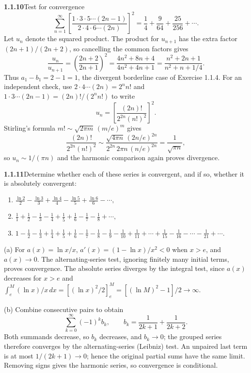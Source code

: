 \par\bigskip
\noindent\textbf{1.1.10}\quad Test for convergence
\[
\sum_{n=1}^{\infty}\left[\frac{1\cdot3\cdot5\cdots(2n-1)}{2\cdot4\cdot6\cdots(2n)}\right]^{2}
=\frac{1}{4}+\frac{9}{64}+\frac{25}{256}+\cdots.
\]
\solution
Let $u_n$ denote the squared product. The product for $u_{n+1}$ has the
extra factor $(2n+1)/(2n+2)$, so cancelling the common factors gives
\[
 \frac{u_n}{u_{n+1}}=\left(\frac{2n+2}{2n+1}\right)^2
 =\frac{4n^2+8n+4}{4n^2+4n+1}
 =\frac{n^2+2n+1}{n^2+n+1/4}.
\]
Thus $a_1-b_1=2-1=1$, the divergent borderline case of Exercise 1.1.4.
For an independent check, use $2\cdot4\cdots(2n)=2^nn!$ and
$1\cdot3\cdots(2n-1)=(2n)!/(2^nn!)$ to write
\[
 u_n=\left[\frac{(2n)!}{2^{2n}(n!)^2}\right]^2.
\]
Stirling's formula $m!\sim\sqrt{2\pi m}\,(m/e)^m$ gives
\[
 \frac{(2n)!}{2^{2n}(n!)^2}\sim
 \frac{\sqrt{4\pi n}\,(2n/e)^{2n}}{2^{2n}\,2\pi n\,(n/e)^{2n}}
 =\frac{1}{\sqrt{\pi n}},
\]
so $u_n\sim1/(\pi n)$ and the harmonic comparison again proves divergence.


\par\bigskip
\noindent\textbf{1.1.11}\quad Determine whether each of these series is
convergent, and if so, whether it is absolutely convergent:
\begin{enumerate}
\item[(a)] $\displaystyle\frac{\ln2}{2}-\frac{\ln3}{3}+\frac{\ln4}{4}
  -\frac{\ln5}{5}+\frac{\ln6}{6}-\cdots,$
\item[(b)] $\displaystyle\frac{1}{1}+\frac{1}{2}-\frac{1}{3}-\frac{1}{4}
  +\frac{1}{5}+\frac{1}{6}-\frac{1}{7}-\frac{1}{8}+\cdots,$
\item[(c)] $\displaystyle 1-\frac{1}{2}-\frac{1}{3}+\frac{1}{4}+\frac{1}{5}
  +\frac{1}{6}-\frac{1}{7}-\frac{1}{8}-\frac{1}{9}-\frac{1}{10}
  +\frac{1}{11}+\cdots+\frac{1}{15}-\frac{1}{16}-\cdots-\frac{1}{21}+\cdots.$
\end{enumerate}
\solution
(a) For $a(x)=\ln x/x$, $a'(x)=(1-\ln x)/x^2<0$ when $x>e$,
and $a(x)\to0$. The alternating-series test, ignoring finitely many
initial terms, proves convergence. The absolute series diverges by the
integral test, since $a(x)$ decreases for $x>e$ and
$\int_e^M(\ln x)/x\,dx=[(\ln x)^2/2]_e^M=[(\ln M)^2-1]/2\to\infty$.

(b) Combine consecutive pairs to obtain
\[
 \sum_{k=0}^\infty(-1)^k b_k,
 \qquad b_k=\frac1{2k+1}+\frac1{2k+2}.
\]
Both summands decrease, so $b_k$ decreases, and $b_k\to0$; the grouped
series therefore converges by the alternating-series (Leibniz) test.
An unpaired last term is at most $1/(2k+1)\to0$; hence the original
partial sums have the same limit. Removing signs gives the harmonic
series, so convergence is conditional.

